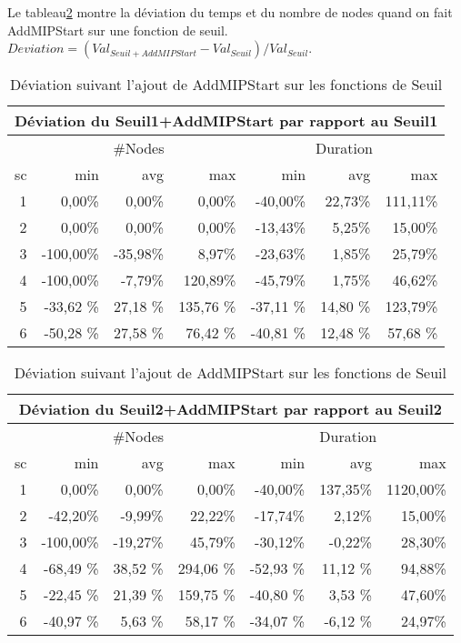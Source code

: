 Le tableau\ref{tab_cut2_ams2_tab1} montre la déviation du temps et du nombre de nodes quand on fait AddMIPStart sur une fonction de seuil. $Deviation = (Val_{Seuil+AddMIPStart}-Val_{Seuil})/Val_{Seuil}$.
\begin{table}[h]
    \centering
    \begin{tabular}{|r|r|r|r|r|r|r|}
    	\hline
    	\multicolumn{7}{|c|}{Déviation du Seuil1+AddMIPStart par rapport au Seuil1 }	\\ \hline
&\multicolumn{3}{c|}{\#Nodes} &\multicolumn{3}{c|}{Duration}	\\ \hline
sc&min	    &avg	    & max	  &min	    &avg	   & max \\ \hline
1&	0,00\%&0,00\%&0,00\%&	-40,00\%&	22,73\%&111,11\%    \\ \hline
2&	0,00\%&0,00\%&0,00\%&	-13,43\%&	5,25\%&	15,00\%     \\ \hline
3&	-100,00\%&-35,98\%&8,97\%&	-23,63\%&	1,85\%&	25,79\%  \\ \hline
4 &-100,00\% &-7,79\% &120,89\% &-45,79\% &1,75\% &46,62\%  \\ \hline
5&-33,62	\%&27,18	\%&135,76 \%&	-37,11	\%&14,80	\%&123,79\%     \\ \hline
6&-50,28	\%&27,58	\%&76,42	\%&-40,81	\%&12,48	\%&57,68 \%     \\ \hline
    \end{tabular}
\medskip \par
    \begin{tabular}{|r|r|r|r|r|r|r|}
    	\hline
    	\multicolumn{7}{|c|}{Déviation du Seuil2+AddMIPStart par rapport au Seuil2 }	\\ \hline
&\multicolumn{3}{c|}{\#Nodes} &\multicolumn{3}{c|}{Duration}	\\ \hline
sc&min	    &avg	    & max	  &min	    &avg	   & max \\ \hline
1&	   0,00\%&	  0,00\%&	 0,00\%&	-40,00\%&	137,35\%&	1120,00\%    \\ \hline
2&	 -42,20\%&	 -9,99\%&	22,22\%&	-17,74\%&	  2,12\%&	  15,00\%     \\ \hline
3&	-100,00\%&	-19,27\%&	45,79\%&	-30,12\%&	 -0,22\%&	  28,30\%  \\ \hline
4&-68,49	\%&38,52	\%&294,06	\%&-52,93	\%&11,12	\%&94,88\%     \\ \hline
5&-22,45	\%&21,39	\%&159,75	\%&-40,80	\%&3,53	    \%&47,60\%     \\ \hline
6&-40,97	\%&5,63	    \%&58,17	\%&-34,07	\%&-6,12	\%&24,97\%     \\ \hline
    \end{tabular}
    \caption{Déviation suivant l'ajout de AddMIPStart sur les fonctions de Seuil}
    \label{tab_cut2_ams2_tab1}
\end{table}

